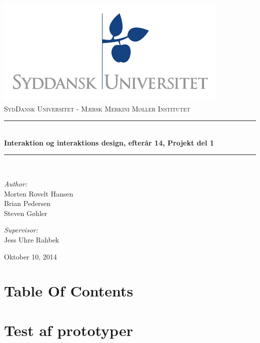 \documentclass[a4paper,titlepage,fleqn,12pt]{article}
\begin{document}
\begin{titlepage}
	\begin{center}
	\includegraphics[scale=1.5,page=7]{sdu_logos.pdf}~\\[0.5cm]
	\textsc{\Large{SydDansk Universitet - Mærsk Merkini Møller Institutet}} \\[0.2cm]
	\rule{12cm}{1pt} \\[0.4cm]
	{ \huge \bfseries Interaktion og interaktions design, efterår 14, Projekt del 1 \\[0.4cm] }
	\rule{12cm}{1pt} \\[1.5cm]
	
	\begin{minipage}{0.4\textwidth}
		\begin{flushleft} \large
			\textit{Author:}\\
			Morten Rovelt Hansen\\
			Brian Pedersen\\
			Steven Gøhler\\
		\end{flushleft}
	\end{minipage}
	\begin{minipage}{0.4\textwidth}
		\begin{flushright} \large
			\textit{Supervisor:} \\
			Jess Uhre Rahbek
		\end{flushright}
	\end{minipage}
	
	\vfill
	
	{\large Oktober 10, 2014}
	\end{center}
	\newpage
\end{titlepage}

\section{Table Of Contents}
\tableofcontents
\newpage

\section{Test af prototyper}
\end{document}
